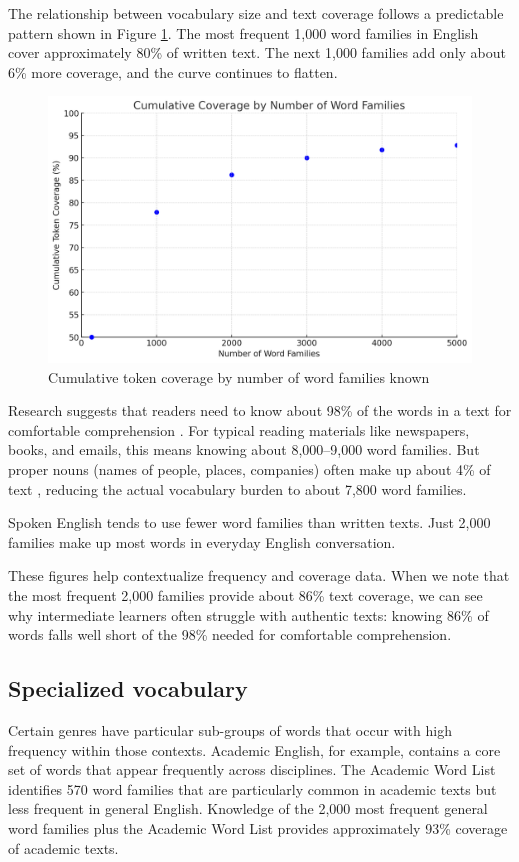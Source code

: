 The relationship between vocabulary size and text coverage follows a predictable pattern shown in Figure \ref{fig:coverage-curve}. The most frequent 1,000 word families in English cover approximately 80\% of written text. The next 1,000 families add only about 6\% more coverage, and the curve continues to flatten.

\begin{figure}
\centering
\includegraphics[width=0.8\linewidth]{figures/cumulative-families.png}
\caption{Cumulative token coverage by number of word families known}
\label{fig:coverage-curve}
\end{figure}

Research suggests that readers need to know about 98\% of the words in a text for comfortable comprehension \citep{Hu2000}. For typical reading materials like newspapers, books, and emails, this means knowing about 8,000--9,000 word families. But proper nouns (names of people, places, companies) often make up about 4\% of text \citep[29]{Nation2022}, reducing the actual vocabulary burden to about 7,800 word families.

Spoken English tends to use fewer word families than written texts. Just 2,000 families make up most words in everyday English conversation.

These figures help contextualize frequency and coverage data. When we note that the most frequent 2,000 families provide about 86\% text coverage, we can see why intermediate learners often struggle with authentic texts: knowing 86\% of words falls well short of the 98\% needed for comfortable comprehension.

\subsection{Specialized vocabulary}

Certain genres have particular sub-groups of words that occur with high frequency within those contexts. Academic English, for example, contains a core set of words that appear frequently across disciplines. The Academic Word List \citep{coxhead2000academic} identifies 570 word families that are particularly common in academic texts but less frequent in general English. Knowledge of the 2,000 most frequent general word families plus the Academic Word List provides approximately 93\% coverage of academic texts.


